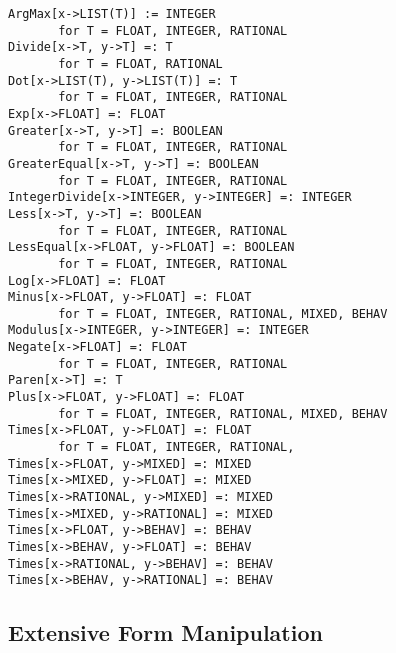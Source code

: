 \begin{verbatim}
ArgMax[x->LIST(T)] := INTEGER
       for T = FLOAT, INTEGER, RATIONAL
Divide[x->T, y->T] =: T
       for T = FLOAT, RATIONAL  
Dot[x->LIST(T), y->LIST(T)] =: T
       for T = FLOAT, INTEGER, RATIONAL
Exp[x->FLOAT] =: FLOAT
Greater[x->T, y->T] =: BOOLEAN
       for T = FLOAT, INTEGER, RATIONAL
GreaterEqual[x->T, y->T] =: BOOLEAN
       for T = FLOAT, INTEGER, RATIONAL
IntegerDivide[x->INTEGER, y->INTEGER] =: INTEGER
Less[x->T, y->T] =: BOOLEAN
       for T = FLOAT, INTEGER, RATIONAL
LessEqual[x->FLOAT, y->FLOAT] =: BOOLEAN
       for T = FLOAT, INTEGER, RATIONAL
Log[x->FLOAT] =: FLOAT
Minus[x->FLOAT, y->FLOAT] =: FLOAT
       for T = FLOAT, INTEGER, RATIONAL, MIXED, BEHAV
Modulus[x->INTEGER, y->INTEGER] =: INTEGER
Negate[x->FLOAT] =: FLOAT
       for T = FLOAT, INTEGER, RATIONAL
Paren[x->T] =: T
Plus[x->FLOAT, y->FLOAT] =: FLOAT
       for T = FLOAT, INTEGER, RATIONAL, MIXED, BEHAV
Times[x->FLOAT, y->FLOAT] =: FLOAT
       for T = FLOAT, INTEGER, RATIONAL,
Times[x->FLOAT, y->MIXED] =: MIXED
Times[x->MIXED, y->FLOAT] =: MIXED
Times[x->RATIONAL, y->MIXED] =: MIXED
Times[x->MIXED, y->RATIONAL] =: MIXED
Times[x->FLOAT, y->BEHAV] =: BEHAV
Times[x->BEHAV, y->FLOAT] =: BEHAV
Times[x->RATIONAL, y->BEHAV] =: BEHAV
Times[x->BEHAV, y->RATIONAL] =: BEHAV
\end{verbatim}

\subsection{Extensive Form Manipulation}

